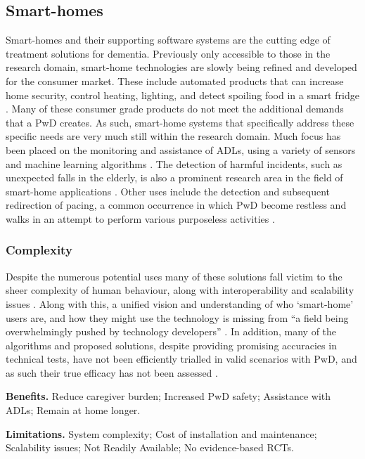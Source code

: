 \subsection{Smart-homes}
Smart-homes and their supporting software systems are the cutting edge of treatment solutions for dementia. Previously only accessible to those in the research domain, smart-home technologies are slowly being refined and developed for the consumer market. These include automated products that can increase home security, control heating, lighting, and detect spoiling food in a smart fridge \cite{Hoy2015, IControlStateofArt2015}. Many of these consumer grade products do not meet the additional demands that a PwD creates. As such, smart-home systems that specifically address these specific needs are very much still within the research domain. Much focus has been placed on the monitoring and assistance of ADLs, using a variety of sensors and machine learning algorithms \cite{Cook2007, Cook2012, Hoey2007, Hoey2010, Chen2012}. The detection of harmful incidents, such as unexpected falls in the elderly, is also a prominent research area in the field of smart-home applications \cite{Chaquet2013,Yang2010}. Other uses include the detection and subsequent redirection of pacing, a common occurrence in which PwD become restless and walks in an attempt to perform various purposeless activities \cite{Nugent2011}.

\subsubsection{Complexity}
Despite the numerous potential uses many of these solutions fall victim to the sheer complexity of human behaviour, along with interoperability and scalability issues \cite{Cook2007, Tang2010, Lim2008}. Along with this, a unified vision and understanding of who `smart-home' users are, and how they might use the technology is missing from ``a field being overwhelmingly pushed by technology developers'' \cite{Wilson2015a}. In addition, many of the algorithms and proposed solutions, despite providing promising accuracies in technical tests, have not been efficiently trialled in valid scenarios with PwD, and as such their true efficacy has not been assessed \cite{Dawson2015, Lyons2015}.

\textbf{Benefits.}
Reduce caregiver burden; Increased PwD safety; Assistance with ADLs; Remain at home longer.

\textbf{Limitations.}
System complexity; Cost of installation and maintenance; Scalability issues; Not Readily Available; No evidence-based RCTs.

